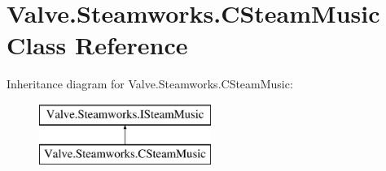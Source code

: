 \hypertarget{classValve_1_1Steamworks_1_1CSteamMusic}{}\section{Valve.\+Steamworks.\+C\+Steam\+Music Class Reference}
\label{classValve_1_1Steamworks_1_1CSteamMusic}
Inheritance diagram for Valve.\+Steamworks.\+C\+Steam\+Music\+:\begin{figure}[H]
\begin{center}
\leavevmode
\includegraphics[height=2.000000cm]{classValve_1_1Steamworks_1_1CSteamMusic}
\end{center}
\end{figure}
